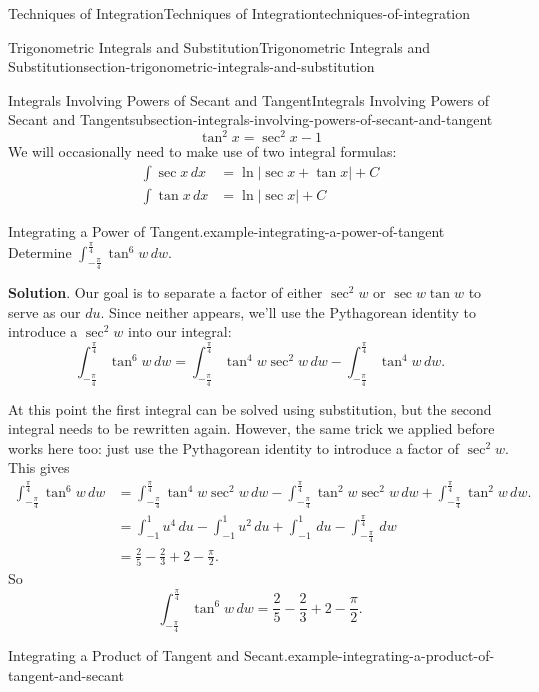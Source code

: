 \documentclass[oneside,10pt,]{book}
\numberwithin{equation}{section}
\begin{document}
\begin{chapterptx}{Techniques of Integration}{}{Techniques of Integration}{}{}{techniques-of-integration}
\begin{sectionptx}{Trigonometric Integrals and Substitution}{}{Trigonometric Integrals and Substitution}{}{}{section-trigonometric-integrals-and-substitution}
\begin{subsectionptx}{Integrals Involving Powers of Secant and Tangent}{}{Integrals Involving Powers of Secant and Tangent}{}{}{subsection-integrals-involving-powers-of-secant-and-tangent}
\begin{equation*}
\tan^{2}x = \sec^{2}x - 1 
\end{equation*}
We will occasionally need to make use of two integral formulas:%
\begin{align*}
\int\sec x\,dx & = \ln|\sec x + \tan x| + C \\
\int\tan x\,dx & = \ln|\sec x| + C 
\end{align*}
%
\begin{example}{Integrating a Power of Tangent.}{example-integrating-a-power-of-tangent}%
\hypertarget{p-532}{}%
Determine \(\int_{-\frac{\pi}{4}}^{\frac{\pi}{4}}\tan^{6}w\,dw\).%
\par\smallskip%
\noindent\textbf{Solution}.\hypertarget{solution-117}{}\quad%
\hypertarget{p-533}{}%
Our goal is to separate a factor of either \(\sec^{2}w\) or \(\sec w\tan w\) to serve as our \(du\). Since neither appears, we'll use the Pythagorean identity to introduce a \(\sec^{2}w\) into our integral:%
\begin{equation*}
\int_{-\frac{\pi}{4}}^{\frac{\pi}{4}}\tan^{6}w\,dw = \int_{-\frac{\pi}{4}}^{\frac{\pi}{4}}\tan^{4}w\sec^{2}w\,dw - \int_{-\frac{\pi}{4}}^{\frac{\pi}{4}}\tan^{4}w\,dw.
\end{equation*}
%
\par
\hypertarget{p-534}{}%
At this point the first integral can be solved using substitution, but the second integral needs to be rewritten again. However, the same trick we applied before works here too: just use the Pythagorean identity to introduce a factor of \(\sec^{2}w\). This gives%
\begin{align*}
\int_{-\frac{\pi}{4}}^{\frac{\pi}{4}}\tan^{6}w\,dw & = \int_{-\frac{\pi}{4}}^{\frac{\pi}{4}}\tan^{4}w\sec^{2}w\,dw - \int_{-\frac{\pi}{4}}^{\frac{\pi}{4}}\tan^{2}w\sec^{2}w\,dw + \int_{-\frac{\pi}{4}}^{\frac{\pi}{4}}\tan^{2}w\,dw.\\
& = \int_{-1}^{1}u^{4}\,du - \int_{-1}^{1}u^{2}\,du + \int_{-1}^{1}\,du - \int_{-\frac{\pi}{4}}^{\frac{\pi}{4}}\,dw \\
& = \frac{2}{5} - \frac{2}{3} + 2 - \frac{\pi}{2}. 
\end{align*}
So%
\begin{equation*}
\int_{-\frac{\pi}{4}}^{\frac{\pi}{4}}\tan^{6}w\,dw = \frac{2}{5} - \frac{2}{3} + 2 - \frac{\pi}{2}.
\end{equation*}
%
\end{example}
\begin{example}{Integrating a Product of Tangent and Secant.}{example-integrating-a-product-of-tangent-and-secant}%

\end{example}
\end{subsectionptx}
\end{sectionptx}
\end{chapterptx}
\end{document}
